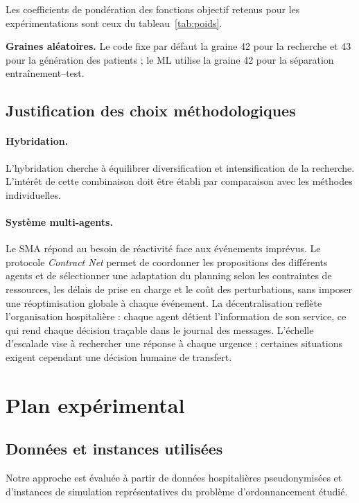 \documentclass[11pt,a4paper]{article}
\begin{document}
Les coefficients de pondération des fonctions objectif retenus pour les expérimentations sont ceux du tableau~\ref{tab:poids}.

\textbf{Graines aléatoires.} Le code fixe par défaut la graine 42 pour la recherche et 43 pour la génération des patients ; le ML utilise la graine 42 pour la séparation entraînement--test.



\subsection{Justification des choix méthodologiques}

\paragraph{Hybridation.}
L'hybridation cherche à équilibrer diversification et intensification de la recherche. L'intérêt de cette combinaison doit être établi par comparaison avec les méthodes individuelles.

\paragraph{Système multi-agents.}
Le SMA répond au besoin de réactivité face aux événements imprévus. Le protocole \emph{Contract Net} permet de coordonner les propositions des différents agents et de sélectionner une adaptation du planning selon les contraintes de ressources, les délais de prise en charge et le coût des perturbations, sans imposer une réoptimisation globale à chaque événement. La décentralisation reflète l'organisation hospitalière : chaque agent détient l'information de son service, ce qui rend chaque décision traçable dans le journal des messages. L’échelle d’escalade vise à rechercher une réponse à chaque urgence ; certaines situations exigent cependant une décision humaine de transfert.




\section{Plan expérimental}
\label{sec:expdesign}

\subsection{Données et instances utilisées}

Notre approche est évaluée à partir de données hospitalières pseudonymisées et d'instances de simulation représentatives du problème d'ordonnancement étudié.
\end{document}
